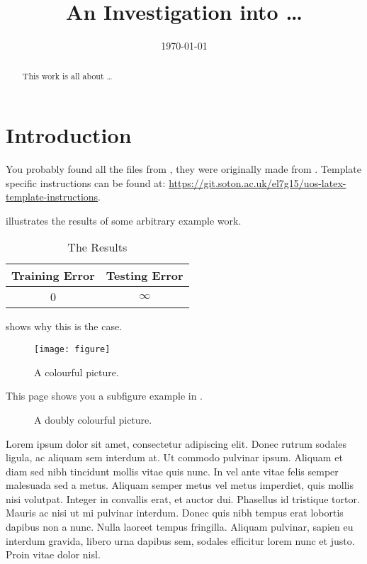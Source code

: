 \documentclass[sotoncolour]{uosarticle}     %
\title      {An Investigation into \dots}
\date       {\today}
\begin{document}
\frontmatter
\maketitle
\begin{abstract}
This work is all about \dots
\end{abstract}
\mainmatter
\section{Introduction} \label{Section:Introduction}
You probably found all the files from \cite{Longman:2019:templ},
they were originally made from \cite{Gunn:2001:pdflatex}.
Template specific instructions can be found at:
\url{https://git.soton.ac.uk/el7g15/uos-latex-template-instructions}.

 illustrates the results of some arbitrary example work.
\begin{table}[!htb]
  \centering
  \begin{tabular}{cc}
  \toprule
  \textbf{Training Error} & \textbf{Testing Error}\\
  \midrule
  0 & $\infty$\\
  \bottomrule
  \end{tabular}
  \caption{The Results}
  \label{Table:tabex}
\end{table}

 shows why this is the case.
\begin{figure}[!htb]
  \centering
  \texttt{[image: figure]}
  \caption{A colourful picture.}
  \label{Figure:figex}
\end{figure}

This page shows you a subfigure example in .
\begin{figure}[!htb]
  \centering
  \caption{A doubly colourful picture.}
  \label{Figure:figsubex}
\end{figure}
Lorem ipsum dolor sit amet, consectetur adipiscing elit. Donec rutrum sodales ligula, ac aliquam sem interdum at. Ut commodo pulvinar ipsum. Aliquam et diam sed nibh tincidunt mollis vitae quis nunc. In vel ante vitae felis semper malesuada sed a metus. Aliquam semper metus vel metus imperdiet, quis mollis nisi volutpat. Integer in convallis erat, et auctor dui. Phasellus id tristique tortor. Mauris ac nisi ut mi pulvinar interdum. Donec quis nibh tempus erat lobortis dapibus non a nunc. Nulla laoreet tempus fringilla. Aliquam pulvinar, sapien eu interdum gravida, libero urna dapibus sem, sodales efficitur lorem nunc et justo. Proin vitae dolor nisl.
\end{document}
